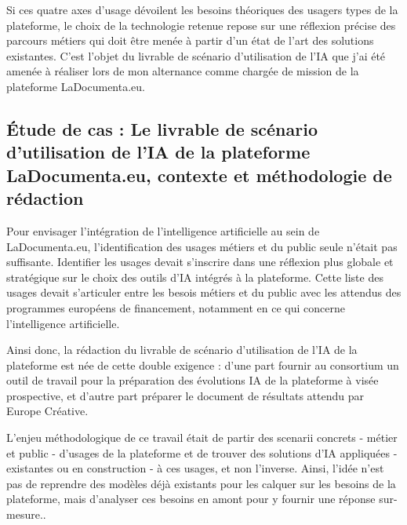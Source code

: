 Si ces quatre axes d'usage dévoilent les besoins théoriques des usagers types de la plateforme, le choix de la technologie retenue repose sur une réflexion précise des parcours métiers qui doit être menée à partir d'un état de l’art des solutions existantes. 
C’est l’objet du livrable de scénario d’utilisation de l’IA que j’ai été amenée à réaliser lors de mon alternance comme chargée de mission de la plateforme LaDocumenta.eu.


\subsection*{Étude de cas : Le livrable de scénario d'utilisation de l'IA de la plateforme LaDocumenta.eu, contexte et méthodologie de rédaction}


Pour envisager l'intégration de l'intelligence artificielle au sein de LaDocumenta.eu, l'identification des usages métiers et du public seule n'était pas suffisante. Identifier les usages devait s'inscrire dans une réflexion plus globale et stratégique sur le choix des outils d'IA intégrés à la plateforme. Cette liste des usages devait s'articuler entre les besois métiers et du public avec les attendus des programmes européens de financement, notamment en ce qui concerne l'intelligence artificielle. 

Ainsi donc, la rédaction du livrable de scénario d'utilisation de l'IA de la plateforme est née de cette double exigence : d'une part fournir au consortium un outil de travail pour la préparation des évolutions IA de la plateforme à visée prospective, et d'autre part préparer le document de résultats attendu par Europe Créative. 

L'enjeu méthodologique de ce travail était de partir des scenarii concrets - métier et public - d'usages de la plateforme et de trouver des solutions d'IA appliquées - existantes ou en construction - à ces usages,
 et non l'inverse. Ainsi, l'idée n'est pas de reprendre des modèles déjà existants pour les calquer sur les besoins de la plateforme, mais d'analyser ces besoins en amont pour y fournir une réponse sur-mesure..

